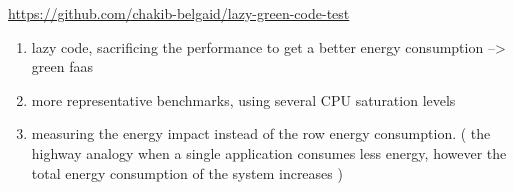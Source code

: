 \url{https://github.com/chakib-belgaid/lazy-green-code-test}



\begin{enumerate}
      \item lazy code, sacrificing the performance to get a better energy consumption --> green faas
      \item more representative benchmarks, using several CPU saturation levels
      \item measuring the energy impact instead of the row energy consumption. ( the highway analogy when a single application consumes less energy, however the total energy consumption of the system increases )
\end{enumerate}
\vfill \strut  %
\cleardoublepage